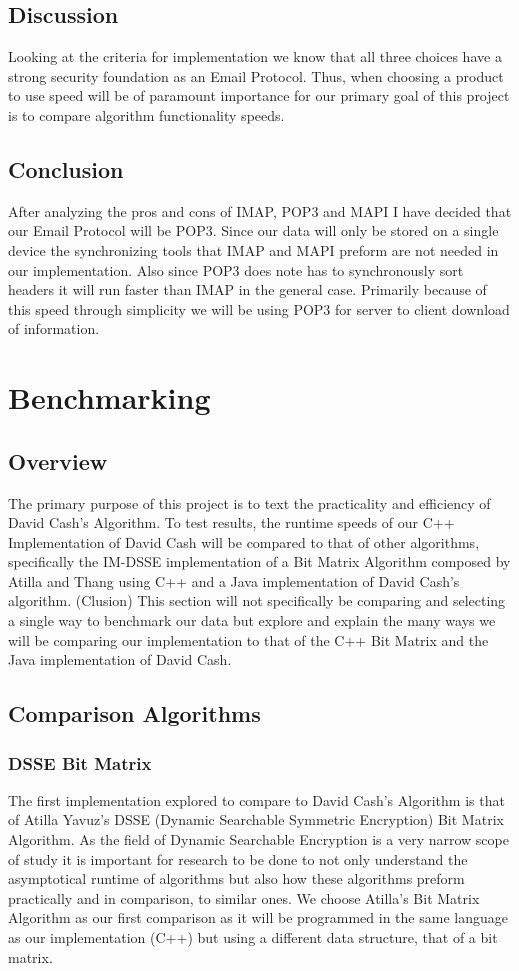 \documentclass[onecolumn, draftclsnofoot,10pt, compsoc]{IEEEtran}
\begin{document}
\subsection{ Discussion }
Looking at the criteria for implementation we know that all three choices have a strong security foundation as an Email Protocol. Thus, when choosing a product to use speed will be of paramount importance for our primary goal of this project is to compare algorithm functionality speeds.
\subsection{ Conclusion }
After analyzing the pros and cons of IMAP, POP3 and MAPI I have decided that our Email Protocol will be POP3. Since our data will only be stored on a single device the synchronizing tools that IMAP and MAPI preform are not needed in our implementation. Also since POP3 does note has to synchronously sort headers it will run faster than IMAP in the general case. Primarily because of this speed through simplicity we will be using POP3 for server to client download of information.



\section{ Benchmarking }

\subsection{ Overview }
The primary purpose of this project is to text the practicality and efficiency of David Cash’s Algorithm. To test results, the runtime speeds of our C++ Implementation of David Cash will be compared to that of other algorithms, specifically the IM-DSSE implementation of a Bit Matrix Algorithm composed by Atilla and Thang using C++  and a Java implementation of David Cash’s algorithm. (Clusion) This section will not specifically be comparing and selecting a single way to benchmark our data but explore and explain the many ways we will be comparing our implementation to that of the C++ Bit Matrix and the Java implementation of David Cash.

\subsection{ Comparison Algorithms }
\subsubsection{ DSSE Bit Matrix}
The first implementation explored to compare to David Cash’s Algorithm is that of Atilla Yavuz’s DSSE (Dynamic Searchable Symmetric Encryption) Bit Matrix Algorithm. As the field of Dynamic Searchable Encryption is a very narrow scope of study it is important for research to be done to not only understand the asymptotical runtime of algorithms but also how these algorithms preform practically and in comparison, to similar ones. We choose Atilla’s Bit Matrix Algorithm as our first comparison as it will be programmed in the same language as our implementation (C++) but using a different data structure, that of a bit matrix. 
\end{document}
